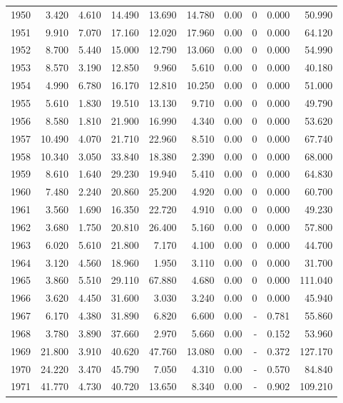 \documentclass[
]{scrartcl}
\begin{document}
\begin{longtable}{rrrrrrrrrr}
1950 & 3.420 & 4.610 & 14.490 & 13.690 & 14.780 & 0.00 & 0 & 0.000 & 50.990 \\ 
1951 & 9.910 & 7.070 & 17.160 & 12.020 & 17.960 & 0.00 & 0 & 0.000 & 64.120 \\ 
1952 & 8.700 & 5.440 & 15.000 & 12.790 & 13.060 & 0.00 & 0 & 0.000 & 54.990 \\ 
1953 & 8.570 & 3.190 & 12.850 & 9.960 & 5.610 & 0.00 & 0 & 0.000 & 40.180 \\ 
1954 & 4.990 & 6.780 & 16.170 & 12.810 & 10.250 & 0.00 & 0 & 0.000 & 51.000 \\ 
1955 & 5.610 & 1.830 & 19.510 & 13.130 & 9.710 & 0.00 & 0 & 0.000 & 49.790 \\ 
1956 & 8.580 & 1.810 & 21.900 & 16.990 & 4.340 & 0.00 & 0 & 0.000 & 53.620 \\ 
1957 & 10.490 & 4.070 & 21.710 & 22.960 & 8.510 & 0.00 & 0 & 0.000 & 67.740 \\ 
1958 & 10.340 & 3.050 & 33.840 & 18.380 & 2.390 & 0.00 & 0 & 0.000 & 68.000 \\ 
1959 & 8.610 & 1.640 & 29.230 & 19.940 & 5.410 & 0.00 & 0 & 0.000 & 64.830 \\ 
1960 & 7.480 & 2.240 & 20.860 & 25.200 & 4.920 & 0.00 & 0 & 0.000 & 60.700 \\ 
1961 & 3.560 & 1.690 & 16.350 & 22.720 & 4.910 & 0.00 & 0 & 0.000 & 49.230 \\ 
1962 & 3.680 & 1.750 & 20.810 & 26.400 & 5.160 & 0.00 & 0 & 0.000 & 57.800 \\ 
1963 & 6.020 & 5.610 & 21.800 & 7.170 & 4.100 & 0.00 & 0 & 0.000 & 44.700 \\ 
1964 & 3.120 & 4.560 & 18.960 & 1.950 & 3.110 & 0.00 & 0 & 0.000 & 31.700 \\ 
1965 & 3.860 & 5.510 & 29.110 & 67.880 & 4.680 & 0.00 & 0 & 0.000 & 111.040 \\ 
1966 & 3.620 & 4.450 & 31.600 & 3.030 & 3.240 & 0.00 & 0 & 0.000 & 45.940 \\ 
1967 & 6.170 & 4.380 & 31.890 & 6.820 & 6.600 & 0.00 &  -  & 0.781 & 55.860 \\ 
1968 & 3.780 & 3.890 & 37.660 & 2.970 & 5.660 & 0.00 &  -  & 0.152 & 53.960 \\ 
1969 & 21.800 & 3.910 & 40.620 & 47.760 & 13.080 & 0.00 &  -  & 0.372 & 127.170 \\ 
1970 & 24.220 & 3.470 & 45.790 & 7.050 & 4.310 & 0.00 &  -  & 0.570 & 84.840 \\ 
1971 & 41.770 & 4.730 & 40.720 & 13.650 & 8.340 & 0.00 &  -  & 0.902 & 109.210 \\ 

\end{longtable}
\end{document}
